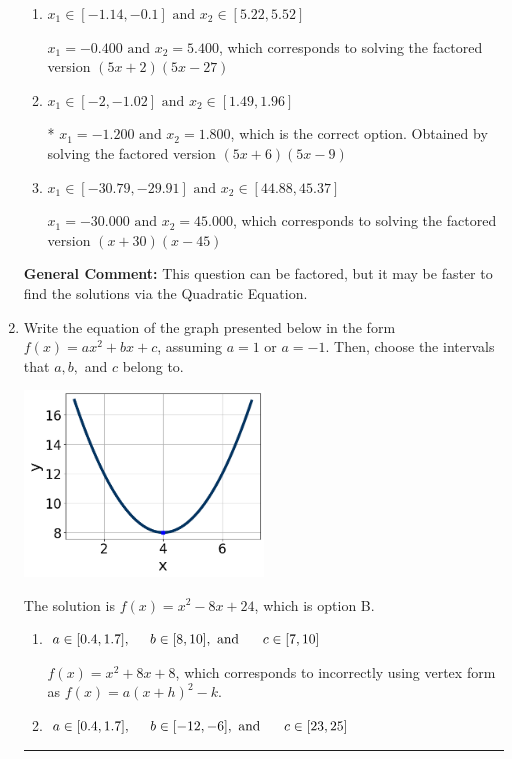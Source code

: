 \documentclass{extbook}[14pt]
\newcommand{\litem}[1]{\item #1

\rule{\textwidth}{0.4pt}}
\begin{document}
\begin{enumerate}
{\begin{enumerate}[label=\Alph*.]
$x_1 = -3.600 \text{ and } x_2 = 0.600$, which corresponds to solving the factored version $(5x + 18)(5x -3)$
\item \( x_1 \in [-1.14, -0.1] \text{ and } x_2 \in [5.22, 5.52] \)

$x_1 = -0.400 \text{ and } x_2 = 5.400$, which corresponds to solving the factored version $(5x + 2)(5x -27)$
\item \( x_1 \in [-2, -1.02] \text{ and } x_2 \in [1.49, 1.96] \)

* $x_1 = -1.200 \text{ and } x_2 = 1.800$, which is the correct option. Obtained by solving the factored version $(5x + 6)(5x -9)$
\item \( x_1 \in [-30.79, -29.91] \text{ and } x_2 \in [44.88, 45.37] \)

$x_1 = -30.000 \text{ and } x_2 = 45.000$, which corresponds to solving the factored version $(x + 30)(x -45)$
\end{enumerate}

\textbf{General Comment:} This question can be factored, but it may be faster to find the solutions via the Quadratic Equation.
}
\litem{
Write the equation of the graph presented below in the form $f(x)=ax^2+bx+c$, assuming  $a=1$ or $a=-1$. Then, choose the intervals that $a, b,$ and $c$ belong to.

\begin{center}
    \includegraphics[width=0.5\textwidth]{../Figures/quadraticGraphToEquationCopyC.png}
\end{center}


The solution is \( f(x) = x^{2} -8 x + 24 \), which is option B.\begin{enumerate}[label=\Alph*.]
\item \( a \in [0.4, 1.7], \hspace*{5mm} b \in [8, 10], \text{ and } \hspace*{5mm} c \in [7, 10] \)

$f(x)=x^{2} +8 x + 8$, which corresponds to incorrectly using vertex form as $f(x) = a(x+h)^2 - k$.
\item \( a \in [0.4, 1.7], \hspace*{5mm} b \in [-12, -6], \text{ and } \hspace*{5mm} c \in [23, 25] \)


\end{enumerate}}
\end{enumerate}
\end{document}
